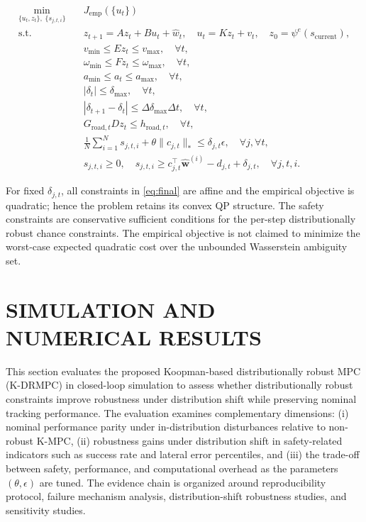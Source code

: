 \documentclass[pdflatex,sn-mathphys,Numbered]{sn-jnl}
\numberwithin{equation}{section}
\begin{document}
\begin{align}
\min_{\{u_t,z_t\},\;\{s_{j,t,i}\}} 
&\quad J_{\mathrm{emp}}(\{u_t\}) \nonumber \\
\text{s.t.} 
&\quad z_{t+1} = A z_t + B u_t + \hat{w}_t,\quad u_t = K z_t + v_t,\quad z_0 = \psi^e(s_{\text{current}}), \nonumber \\
&\quad v_{\min} \le E z_t \le v_{\max},\quad \forall t, \nonumber \\
&\quad \omega_{\min} \le F z_t \le \omega_{\max},\quad \forall t, \nonumber \\
&\quad a_{\min} \le a_t \le a_{\max},\quad \forall t, \nonumber \\
&\quad |\delta_t| \le \delta_{\max},\quad \forall t, \nonumber \\
&\quad |\delta_{t+1} - \delta_t| \le \Delta\delta_{\max}\Delta t,\quad \forall t, \nonumber \\
&\quad G_{\text{road},t} D z_t \le h_{\text{road},t},\quad \forall t, \nonumber \\
&\quad \frac{1}{N}\sum_{i=1}^{N}s_{j,t,i} + \theta\|c_{j,t}\|_* \le \delta_{j,t}\epsilon,\quad \forall j,\forall t, \nonumber \\
&\quad s_{j,t,i} \ge 0,\quad s_{j,t,i} \ge c_{j,t}^\top \hat{\mathbf{w}}^{(i)} - d_{j,t} + \delta_{j,t},\quad \forall j,t,i. \label{eq:final}
\end{align}

For fixed $\delta_{j,t}$, all constraints in \eqref{eq:final} are affine and the empirical objective is quadratic; hence the problem retains its convex QP structure. The safety constraints are conservative sufficient conditions for the per-step distributionally robust chance constraints. The empirical objective is not claimed to minimize the worst-case expected quadratic cost over the unbounded Wasserstein ambiguity set.

	\section{SIMULATION AND NUMERICAL RESULTS}
	\label{sec:simulation}
	
	This section evaluates the proposed Koopman-based distributionally robust MPC (K-DRMPC) in closed-loop simulation to assess whether distributionally robust constraints improve robustness under distribution shift while preserving nominal tracking performance.
	The evaluation examines complementary dimensions: (i) nominal performance parity under in-distribution disturbances relative to non-robust K-MPC, (ii) robustness gains under distribution shift in safety-related indicators such as success rate and lateral error percentiles, and (iii) the trade-off between safety, performance, and computational overhead as the parameters $(\theta,\epsilon)$ are tuned. The evidence chain is organized around reproducibility protocol, failure mechanism analysis, distribution-shift robustness studies, and sensitivity studies.
	
\end{document}
